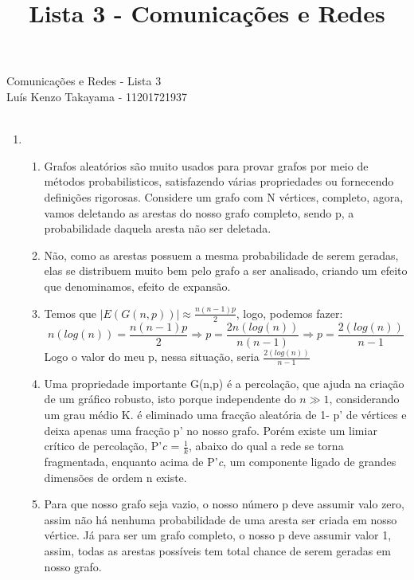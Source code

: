 \documentclass[11pt,reqno]{amsart}
\title {Lista 3 - Comunicações e Redes}
\author{}
\date{}
\begin{document}
	\begin{center}
		Comunicações e Redes - Lista 3\\
		Luís Kenzo Takayama - 11201721937 \\ \ \\
	\end{center}

	\begin{enumerate}

		\item

		\vspace{0.3cm}

		\begin{enumerate}
			\item Grafos aleatórios são muito usados para provar grafos por meio de métodos probabilisticos,
			 satisfazendo várias propriedades ou fornecendo definições rigorosas. Considere um grafo com 
			 N vértices, completo, agora, vamos deletando as arestas do nosso grafo completo, sendo p, a 
			 probabilidade daquela aresta não ser deletada.
			\item Não, como as arestas possuem a mesma probabilidade de serem geradas, elas se distribuem 
			muito bem pelo grafo a ser analisado, criando um efeito que denominamos, efeito de expansão.
			\item Temos que $|E(G(n,p))| \approx \frac{n(n-1)p}{2}$, logo, podemos fazer: \[n (log(n)) = 
			\frac{n(n-1)p}{2} \Rightarrow p = \frac{2 n(log(n))}{n(n-1)} \Rightarrow p = \frac{2(log(n))}{n-
			1}\] Logo o valor do meu p, nessa situação, seria $\frac{2(log(n))}{n-1}$
			\item Uma propriedade importante G(n,p) é a percolação, que ajuda na criação de um gráfico 
			robusto, isto porque independente do $n \gg 1$, considerando um grau médio K. é eliminado uma 
			fracção aleatória de 1- p' de vértices e deixa apenas uma fracção p' no nosso grafo.
			Porém existe um limiar crítico de percolação, P'\textit{c} = $\frac{1}{k}$, abaixo do qual 
			a rede se torna fragmentada, enquanto acima de P'\textit{c}, um componente ligado de grandes 
			dimensões de ordem n existe.
			\item Para que nosso grafo seja vazio, o nosso número p deve assumir valo zero, assim não
			há nenhuma probabilidade de uma aresta ser criada em nosso vértice. Já para ser um grafo 
			completo, o nosso p deve assumir valor 1, assim, todas as arestas possíveis tem total chance
			de serem geradas em nosso grafo.
		\end{enumerate}


\end{enumerate}
\end{document}
